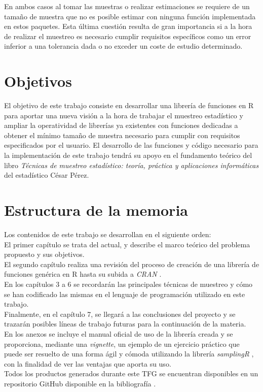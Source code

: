 En ambos casos al tomar las muestras o realizar estimaciones se requiere de un tamaño de muestra que no es posible estimar con ninguna función implementada en estos paquetes. Esta última cuestión resulta de gran importancia si a la hora de realizar el muestreo es necesario cumplir requisitos específicos como un error inferior a una tolerancia dada o no exceder un coste de estudio determinado.\\

\section{Objetivos}
El objetivo de este trabajo consiste en desarrollar una librería de funciones en R para aportar una nueva visión a la hora de trabajar el muestreo estadístico y ampliar la operatividad de librerías ya existentes con funciones dedicadas a obtener el mínimo tamaño de muestra necesario para cumplir con requisitos especificados por el usuario. El desarrollo de las funciones y código necesario para la implementación de este trabajo tendrá su apoyo en el fundamento teórico del libro \textit{Técnicas de muestreo estadístico: teoría, práctica y aplicaciones informáticas} \cite{librobase} del estadístico César Pérez. \\

\section{Estructura de la memoria}
Los contenidos de este trabajo se desarrollan en el siguiente orden:\\

El primer capítulo se trata del actual, y describe el marco teórico del problema propuesto y sus objetivos.\\

El segundo capítulo realiza una revisión del proceso de creación de una librería de funciones genérica en R hasta su subida a \textit{CRAN} \cite{CRAN}. \\

En los capítulos 3 a 6 se recordarán las principales técnicas de muestreo y cómo se han codificado las mismas en el lenguaje de programación utilizado en este trabajo. \\

Finalmente, en el capítulo 7, se llegará a las conclusiones del proyecto y se trazarán posibles líneas de trabajo futuras para la continuación de la materia.\\

En los anexos se incluye el manual oficial de uso de la librería creada y se proporciona, mediante una \textit{vignette}, un ejemplo de un ejercicio práctico que puede ser resuelto de una forma ágil y cómoda utilizando la librería \textit{samplingR} \cite{samplingR}, con la finalidad de  ver las ventajas que aporta su uso. \\  

Todos los productos generados durante este TFG se encuentran disponibles en un repositorio GitHub disponible en la bibliografía \cite{github}.
